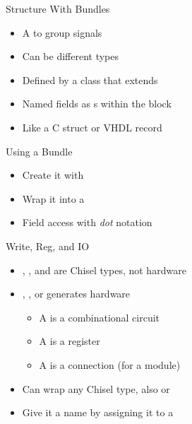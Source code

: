\begin{frame}[fragile]{Structure With Bundles}
\begin{itemize}
\item A  to group signals
\item Can be different types
\item Defined by a class that extends 
\item Named fields as s within the block
\item Like a C struct or VHDL record
\end{itemize}
\end{frame}

\begin{frame}[fragile]{Using a Bundle}
\begin{itemize}
\item Create it with 
\item Wrap it into a 
\item Field access with \emph{dot} notation
\end{itemize}
\end{frame}

\begin{frame}[fragile]{Write, Reg, and IO}
\begin{itemize}
\item {}, , and  are Chisel types, not hardware
\item {}, , or  generates hardware
\begin{itemize}
\item A  is a combinational circuit
\item A  is a register
\item A  is a connection (for a module)
\end{itemize}
\item Can wrap any Chisel type, also  or 
\item Give it a name by assigning it to a 
\end{itemize}
\end{frame}

